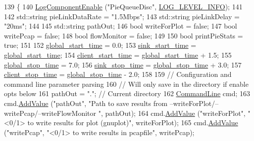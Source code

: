 \begin{DoxyCode}
139 \{
140   \hyperlink{namespacens3_adc4ef4f00bb2f5f4edae67fc3bc27f20}{LogComponentEnable} (\textcolor{stringliteral}{"PieQueueDisc"}, \hyperlink{namespacens3_aa6464a4d69551a9cc968e17a65f39bdbae36aedc880de94fd5a5b53bb9fe65628}{LOG\_LEVEL\_INFO});
141 
142   std::string pieLinkDataRate = \textcolor{stringliteral}{"1.5Mbps"};
143   std::string pieLinkDelay = \textcolor{stringliteral}{"20ms"};
144 
145   std::string pathOut;
146   \textcolor{keywordtype}{bool} writeForPlot = \textcolor{keyword}{false};
147   \textcolor{keywordtype}{bool} writePcap = \textcolor{keyword}{false};
148   \textcolor{keywordtype}{bool} flowMonitor = \textcolor{keyword}{false};
149 
150   \textcolor{keywordtype}{bool} printPieStats = \textcolor{keyword}{true};
151 
152   \hyperlink{pie-example_8cc_ab3a0ca969f11332a6b4ca8bc81e19ba7}{global\_start\_time} = 0.0;
153   \hyperlink{pie-example_8cc_a2c56dc9b543a4442a7edd8d680c4a1bc}{sink\_start\_time} = \hyperlink{pie-example_8cc_ab3a0ca969f11332a6b4ca8bc81e19ba7}{global\_start\_time};
154   \hyperlink{pie-example_8cc_a18ff86acaf663200fbedb1f77d03b515}{client\_start\_time} = \hyperlink{pie-example_8cc_ab3a0ca969f11332a6b4ca8bc81e19ba7}{global\_start\_time} + 1.5;
155   \hyperlink{pie-example_8cc_a374328526043935f11841a7ec7e396d5}{global\_stop\_time} = 7.0;
156   \hyperlink{pie-example_8cc_a2462eef540f5b896f14d4ea7b7bb6214}{sink\_stop\_time} = \hyperlink{pie-example_8cc_a374328526043935f11841a7ec7e396d5}{global\_stop\_time} + 3.0;
157   \hyperlink{pie-example_8cc_aee714f5dcf74da2f73bcdd66c8a9e265}{client\_stop\_time} = \hyperlink{pie-example_8cc_a374328526043935f11841a7ec7e396d5}{global\_stop\_time} - 2.0;
158 
159   \textcolor{comment}{// Configuration and command line parameter parsing}
160   \textcolor{comment}{// Will only save in the directory if enable opts below}
161   pathOut = \textcolor{stringliteral}{"."}; \textcolor{comment}{// Current directory}
162   \hyperlink{classns3_1_1CommandLine}{CommandLine} cmd;
163   cmd.\hyperlink{classns3_1_1CommandLine_addcfb546c7ad4c8bd0965654d55beb8e}{AddValue} (\textcolor{stringliteral}{"pathOut"}, \textcolor{stringliteral}{"Path to save results from --writeForPlot/--writePcap/--writeFlowMonitor
      "}, pathOut);
164   cmd.\hyperlink{classns3_1_1CommandLine_addcfb546c7ad4c8bd0965654d55beb8e}{AddValue} (\textcolor{stringliteral}{"writeForPlot"}, \textcolor{stringliteral}{"<0/1> to write results for plot (gnuplot)"}, writeForPlot);
165   cmd.\hyperlink{classns3_1_1CommandLine_addcfb546c7ad4c8bd0965654d55beb8e}{AddValue} (\textcolor{stringliteral}{"writePcap"}, \textcolor{stringliteral}{"<0/1> to write results in pcapfile"}, writePcap);

\end{DoxyCode}
